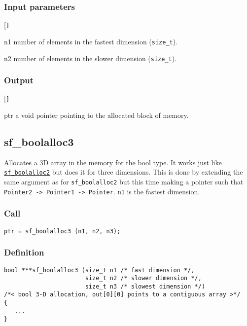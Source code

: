 \subsubsection*{Input parameters}
\begin{desclist}{\tt }{\quad}[\tt ]
   \setlength\itemsep{0pt}
   \item[n1] number of elements in the fastest dimension (\texttt{size\_t}).
   \item[n2] number of elements in the slower dimension (\texttt{size\_t}).
\end{desclist}

\subsubsection*{Output}
\begin{desclist}{\tt }{\quad}[\tt ]
   \setlength\itemsep{0pt}
   \item[ptr] a void pointer pointing to the allocated block of memory.
\end{desclist}




\subsection{{sf\_boolalloc3}}
Allocates a 3D array in the memory for the bool type. It works just like \hyperref[sec:sf_boolalloc2]{\texttt{sf\_boolalloc2}} but does it for three dimensions. This is done by extending the same argument as for \texttt{sf\_boolalloc2} but this time making a pointer such that \texttt{Pointer2 -> Pointer1 -> Pointer}. \texttt{n1} is the fastest dimension.

\subsubsection*{Call}
\begin{verbatim}ptr = sf_boolalloc3 (n1, n2, n3);\end{verbatim}

\subsubsection*{Definition}
\begin{verbatim}
bool ***sf_boolalloc3 (size_t n1 /* fast dimension */, 
                       size_t n2 /* slower dimension */, 
                       size_t n3 /* slowest dimension */)
/*< bool 3-D allocation, out[0][0] points to a contiguous array >*/ 
{
   ...
}
\end{verbatim}

